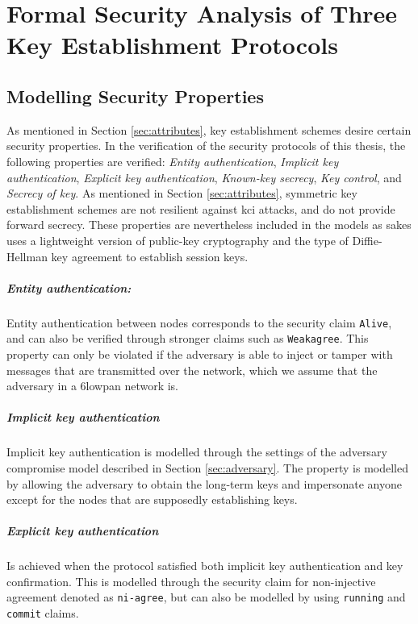 \chapter{Formal Security Analysis of Three Key Establishment Protocols}
\label{chp:analysis}


\section{Modelling Security Properties}

As mentioned in Section \ref{sec:attributes}, key establishment schemes desire certain security properties. In the verification of the security protocols of this thesis, the following properties are verified: \emph{Entity authentication}, \emph{Implicit key authentication}, \emph{Explicit key authentication}, \emph{Known-key secrecy}, \emph{Key control}, and \emph{Secrecy of key}. As mentioned in Section \ref{sec:attributes}, symmetric key establishment schemes are not resilient against \gls{kci} attacks, and do not provide forward secrecy. These properties are nevertheless included in the models as \gls{sakes} uses a lightweight version of public-key cryptography and the type of Diffie-Hellman key agreement to establish session keys.

\paragraph{Entity authentication:} Entity authentication between nodes corresponds to the security claim \texttt{Alive}, and can also be verified through stronger claims such as \texttt{Weakagree}. This property can only be violated if the adversary is able to inject or tamper with messages that are transmitted over the network, which we assume that the adversary in a \gls{6lowpan} network is.

\paragraph{Implicit key authentication} Implicit key authentication is modelled through the settings of the adversary compromise model described in Section \ref{sec:adversary}. The property is modelled by allowing the adversary to obtain the long-term keys and impersonate anyone except for the nodes that are supposedly establishing keys.

\paragraph{Explicit key authentication} Is achieved when the protocol satisfied both implicit key authentication and key confirmation. This is modelled through the security claim for non-injective agreement denoted as \texttt{ni-agree}, but can also be modelled by using \texttt{running} and \texttt{commit} claims.

